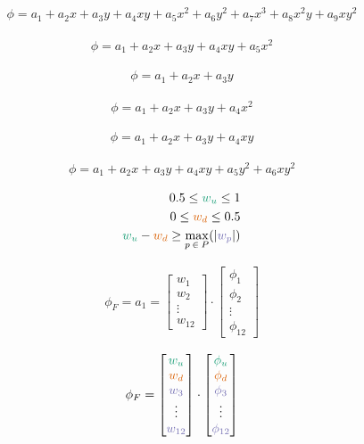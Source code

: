 \documentclass{article}
\begin{document}
\begin{align*}
\phi = a_1 + a_2 x + a_3 y + a_4 x y + a_5 x^2 + a_6 y^2 + a_7 x^3 + a_8 x^2 y + a_9 x y^2
\end{align*}

\begin{align*}
\phi = a_1 + a_2 x + a_3 y + a_4 x y + a_5 x^2
\end{align*}

\begin{align*}
\phi = a_1 + a_2 x + a_3 y
\end{align*}

\begin{align*}
\phi = a_1 + a_2 x + a_3 y + a_4 x^2
\end{align*}


\begin{align*}
\phi = a_1 + a_2 x + a_3 y + a_4 x y
\end{align*}

\begin{align*}
\phi = a_1 + a_2 x + a_3 y + a_4 x y + a_5 y^2 + a_6 x y^2
\end{align*}

\begin{align*}
	0.5 \leq \textcolor{u}{w_u} \leq 1 \\
	0 \leq \textcolor{d}{w_d} \leq 0.5 \\
	\textcolor{u}{w_u} - \textcolor{d}{w_d} \geq \max_{p\:\in\:P}(|\textcolor{p}{w_p}|)
\end{align*}

\begin{align*}
	\phi_F = a_1 = \begin{bmatrix}
		w_1 \\
		w_2 \\
		\vdots \\
		w_{12}
	\end{bmatrix}
	\cdot
	\begin{bmatrix}
		\phi_1 \\
		\phi_2 \\
		\vdots \\
		\phi_{12}
	\end{bmatrix}
\end{align*}

\begin{align*}
	\phi_F = \begin{bmatrix}
		\textcolor{u}{w_u} \\
		\textcolor{d}{w_d} \\
		\textcolor{p}{w_3} \\
		\vdots \\
		\textcolor{p}{w_{12}}
	\end{bmatrix}
	\cdot
	\begin{bmatrix}
		\textcolor{u}{\phi_u} \\
		\textcolor{d}{\phi_d} \\
		\textcolor{p}{\phi_3} \\
		\vdots \\
		\textcolor{p}{\phi_{12}}
	\end{bmatrix}
\end{align*}
\end{document}
